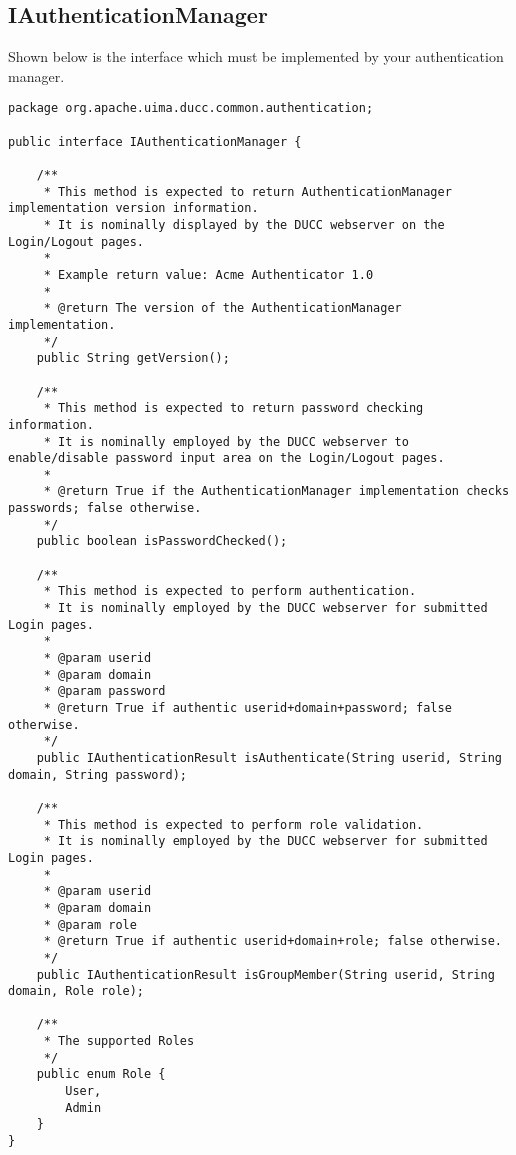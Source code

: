 \subsection{IAuthenticationManager}
    \begin{description}
       
    Shown below is the interface which must be implemented by your
    authentication manager.
    
    \begin{verbatim}
package org.apache.uima.ducc.common.authentication;

public interface IAuthenticationManager {
    
    /**
     * This method is expected to return AuthenticationManager implementation version information.  
     * It is nominally displayed by the DUCC webserver on the Login/Logout pages.
     * 
     * Example return value: Acme Authenticator 1.0
     * 
     * @return The version of the AuthenticationManager implementation.
     */
    public String getVersion();
    
    /**
     * This method is expected to return password checking information.  
     * It is nominally employed by the DUCC webserver to enable/disable password input area on the Login/Logout pages.
     * 
     * @return True if the AuthenticationManager implementation checks passwords; false otherwise.
     */
    public boolean isPasswordChecked();
    
    /**
     * This method is expected to perform authentication.
     * It is nominally employed by the DUCC webserver for submitted Login pages.
     * 
     * @param userid
     * @param domain
     * @param password
     * @return True if authentic userid+domain+password; false otherwise.
     */
    public IAuthenticationResult isAuthenticate(String userid, String domain, String password);
    
    /**
     * This method is expected to perform role validation.
     * It is nominally employed by the DUCC webserver for submitted Login pages.
     * 
     * @param userid
     * @param domain
     * @param role
     * @return True if authentic userid+domain+role; false otherwise.
     */
    public IAuthenticationResult isGroupMember(String userid, String domain, Role role);
    
    /**
     * The supported Roles
     */
    public enum Role {
        User,
        Admin
    }
}
    \end{verbatim}
    \end{description}

